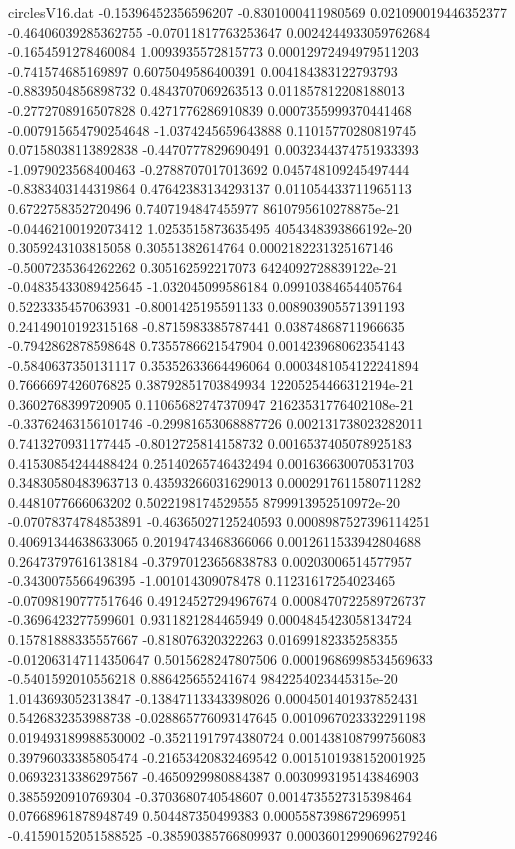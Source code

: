 \begin{filecontents}{circlesV16.dat}
-0.15396452356596207	-0.8301000411980569	0.021090019446352377
-0.46406039285362755	-0.07011817763253647	0.0024244933059762684
-0.1654591278460084	1.0093935572815773	0.00012972494979511203
-0.741574685169897	0.6075049586400391	0.004184383122793793
-0.8839504856898732	0.4843707069263513	0.011857812208188013
-0.2772708916507828	0.4271776286910839	0.0007355999370441468
-0.007915654790254648	-1.0374245659643888	0.11015770280819745
0.07158038113892838	-0.4470777829690491	0.0032344374751933393
-1.0979023568400463	-0.2788707017013692	0.045748109245497444
-0.8383403144319864	0.47642383134293137	0.011054433711965113
0.6722758352720496	0.7407194847455977	8610795610278875e-21
-0.04462100192073412	1.0253515873635495	4054348393866192e-20
0.3059243103815058	0.30551382614764	0.0002182231325167146
-0.5007235364262262	0.305162592217073	6424092728839122e-21
-0.04835433089425645	-1.032045099586184	0.09910384654405764
0.5223335457063931	-0.8001425195591133	0.008903905571391193
0.24149010192315168	-0.8715983385787441	0.03874868711966635
-0.7942862878598648	0.7355786621547904	0.001423968062354143
-0.5840637350131117	0.35352633664496064	0.0003481054122241894
0.7666697426076825	0.38792851703849934	12205254466312194e-21
0.3602768399720905	0.11065682747370947	21623531776402108e-21
-0.33762463156101746	-0.29981653068887726	0.002131738023282011
0.7413270931177445	-0.8012725814158732	0.0016537405078925183
0.41530854244488424	0.25140265746432494	0.001636630070531703
0.34830580483963713	0.43593266031629013	0.0002917611580711282
0.4481077666063202	0.5022198174529555	8799913952510972e-20
-0.07078374784853891	-0.46365027125240593	0.0008987527396114251
0.40691344638633065	0.20194743468366066	0.0012611533942804688
0.26473797616138184	-0.37970123656838783	0.00203006514577957
-0.3430075566496395	-1.001014309078478	0.11231617254023465
-0.07098190777517646	0.49124527294967674	0.0008470722589726737
-0.3696423277599601	0.9311821284465949	0.0004845423058134724
0.15781888335557667	-0.818076320322263	0.01699182335258355
-0.012063147114350647	0.5015628247807506	0.00019686998534569633
-0.5401592010556218	0.886425655241674	9842254023445315e-20
1.0143693052313847	-0.13847113343398026	0.0004501401937852431
0.5426832353988738	-0.028865776093147645	0.0010967023332291198
0.019493189988530002	-0.35211917974380724	0.001438108799756083
0.39796033385805474	-0.21653420832469542	0.0015101938152001925
0.06932313386297567	-0.4650929980884387	0.0030993195143846903
0.3855920910769304	-0.3703680740548607	0.0014735527315398464
0.07668961878948749	0.504487350499383	0.0005587398672969951
-0.41590152051588525	-0.38590385766809937	0.00036012990696279246

\end{filecontents}
